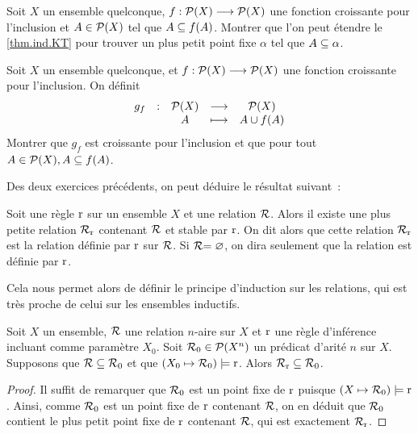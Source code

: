 \begin{exercise}
  Soit $X$ un ensemble quelconque,
  $f : \displaystyle \mathcal{P}(X) \longrightarrow \mathcal{P}(X)$ une
  fonction croissante pour l'inclusion et $A \in \mathcal{P}(X)$ tel que
  $A\subseteq f(A)$. Montrer que l'on peut étendre le
  \cref{thm.ind.KT} pour trouver un plus petit point fixe $\alpha$ tel que
  $A\subseteq \alpha$.
\end{exercise}

\begin{exercise}
  Soit $X$ un ensemble quelconque, et
  $f : \displaystyle \mathcal{P}(X) \longrightarrow \mathcal{P}(X)$ une
  fonction croissante pour l'inclusion. On définit
  \[\makeFun{g_f}{\powerset(X)}{\powerset(X)}{\varPt}{\varPt\cup f(\varPt)}\]
  Montrer que $g_f$ est croissante pour l'inclusion et que pour tout
  $A\in\mathcal{P}(X), A\subseteq f(A)$.
\end{exercise}

\noindent
Des deux exercices précédents, on peut déduire le résultat suivant~:

\begin{corollary}
  Soit une règle $\operatorname{r}$ sur un ensemble $X$ et une relation $\mathrel{\mathcal{R}}$. Alors
  il existe une plus petite relation $\mathrel{\mathcal{R}}_{\operatorname{r}}$ contenant $\mathrel{\mathcal{R}}$ et
  stable par $\operatorname{r}$. On dit
  alors que cette relation $\mathrel{\mathcal{R}}_{\operatorname{r}}$ est la relation définie par
  $\operatorname{r}$ sur $\mathrel{\mathcal{R}}$. Si
  $\mathrel{\mathcal{R}} = \varnothing$, on dira seulement que la relation est définie par $\operatorname{r}$.
\end{corollary}

Cela nous permet alors de définir le principe d'induction sur les relations,
qui est très proche de celui sur les ensembles inductifs.

\begin{theorem}
  Soit $X$ un ensemble, $\mathrel{\mathcal{R}}$ une relation $n$-aire sur $X$ et $\operatorname{r}$ une
  règle d'inférence incluant comme paramètre $X_0$.
  Soit $\mathord{\mathrel{\mathcal{R}}_0} \in \mathcal{P}(X^n)$ un prédicat d'arité $n$ sur $X$.
  Supposons que $\mathord{\mathrel{\mathcal{R}}}\subseteq \mathord{\mathrel{\mathcal{R}}_0}$ et que
  $(X_0\mapsto \mathord{\mathrel{\mathcal{R}}_0})\models \operatorname{r}$.
  Alors $\mathord{\mathrel{\mathcal{R}}_{\operatorname{r}}}\subseteq \mathord{\mathrel{\mathcal{R}}_0}$.
\end{theorem}

\begin{proof}
  Il suffit de remarquer que $\mathrel{\mathcal{R}}_0$ est un point fixe de $\operatorname{r}$ puisque
  $(X\mapsto \mathord{\mathrel{\mathcal{R}}_0})\models \operatorname{r}$. Ainsi, comme $\mathrel{\mathcal{R}}_0$ est
  un point fixe de $\operatorname{r}$ contenant $\mathrel{\mathcal{R}}$, on en déduit que $\mathrel{\mathcal{R}}_0$
  contient le plus petit point fixe de $\operatorname{r}$ contenant $\mathrel{\mathcal{R}}$, qui est
  exactement $\mathrel{\mathcal{R}}_{\operatorname{r}}$.
\end{proof}

